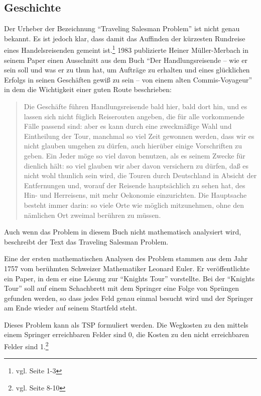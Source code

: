 \documentclass[11pt,a4paper]{article}
\begin{document}
\subsection{Geschichte}
Der Urheber der Bezeichnung "`Traveling Salesman Problem"' ist nicht genau bekannt. Es ist jedoch klar, dass damit das Auffinden der kürzesten Rundreise eines Handelsreisenden gemeint ist.\footnote{vgl. \cite{applegate06} Seite 1-3} 1983 publizierte Heiner Müller-Merbach in seinem Paper\cite{mueller83} einen Ausschnitt aus dem Buch "`Der Handlungsreisende – wie er sein soll und was er zu thun hat, um Aufträge zu erhalten und eines glücklichen Erfolgs in seinen Geschäften gewiß zu sein – von einem alten Commis-Voyageur"' in dem die Wichtigkeit einer guten Route beschrieben:  
\begin{quotation}
Die Geschäfte führen Handlungsreisende bald hier, bald dort hin, und es lassen sich nicht füglich Reiserouten angeben, die für alle vorkommende Fälle passend sind: aber es kann durch eine zweckmäßige Wahl und Eintheilung der Tour, manchmal so viel Zeit gewonnen werden, dass wir es nicht glauben umgehen zu dürfen, auch hierüber einige Vorschriften zu geben. Ein Jeder möge so viel davon benutzen, als es seinem Zwecke für dienlich hält: so viel glauben wir aber davon versichern zu dürfen, daß es nicht wohl thunlich sein wird, die Touren durch Deutschland in Absicht der Entfernungen und, worauf der Reisende hauptsächlich zu sehen hat, des Hin- und Herreisens, mit mehr Oekonomie einzurichten. Die Hauptsache besteht immer darin: so viele Orte wie möglich mitzunehmen, ohne den nämlichen Ort zweimal berühren zu müssen.
\end{quotation}

Auch wenn das Problem in diesem Buch nicht mathematisch analysiert wird, beschreibt der Text das Traveling Salesman Problem. 

Eine der ersten mathematischen Analysen des Problem stammen aus dem Jahr 1757 vom berühmten Schweizer Mathematiker Leonard Euler. Er veröffentlichte ein Paper, in dem er eine Lösung zur "`Knights Tour"' vorstellte. Bei der "`Knights Tour"' soll auf einem Schachbrett mit dem Springer eine Folge von Sprüngen gefunden werden, so dass jedes Feld genau einmal besucht wird und der Springer am Ende wieder auf seinem Startfeld steht.

Dieses Problem kann als TSP formuliert werden. Die Wegkosten zu den mittels einem Springer erreichbaren Felder sind 0, die Kosten zu den nicht erreichbaren Felder sind 1.\footnote{vgl. \cite{applegate06} Seite 8-10}
\end{document}
